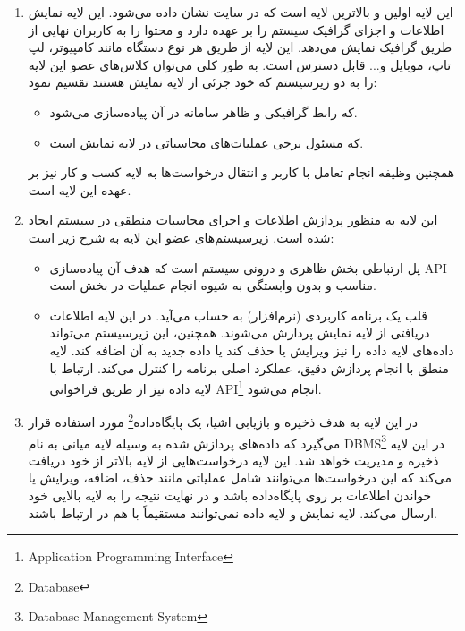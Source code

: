 \documentclass[12pt]{article}
\begin{document}
	\begin{enumerate}
		\item {}
		این لایه اولین و بالاترین لایه است که در سایت نشان داده می‌شود. این لایه نمایش اطلاعات و اجزای گرافیک سیستم را بر عهده دارد و محتوا را به کاربران نهایی از طریق گرافیک نمایش می‌دهد. این لایه از طریق هر نوع دستگاه مانند کامپیوتر، لپ تاپ، موبایل و... قابل دسترس است. به طور کلی می‌توان کلاس‌های عضو این لایه را به دو زیرسیستم که خود جزئی از لایه نمایش هستند تقسیم نمود:

		\begin{itemize}
			\item {}
			که رابط گرافیکی و ظاهر سامانه در آن پیاده‌سازی می‌شود.
			\item {}
			که مسئول برخی عملیات‌های محاسباتی در لایه نمایش است.
		\end{itemize}
		همچنین وظیفه انجام تعامل با کاربر و انتقال درخواست‌ها به لایه کسب و کار نیز بر عهده این لایه است.

		\item {}
		این لایه به منظور پردازش اطلاعات و اجرای محاسبات منطقی در سیستم ایجاد شده است. زیرسیستم‌های عضو این لایه به شرح زیر است:

		\begin{itemize}
			\item {}
			پل ارتباطی بخش ظاهری و درونی سیستم است که هدف آن پیاده‌سازی API مناسب و بدون وابستگی به شیوه انجام عملیات در بخش
			است.

			\item {}
			قلب یک برنامه کاربردی (نرم‌افزار) به حساب می‌آید. در این لایه اطلاعات دریافتی از لایه نمایش پردازش می‌شوند. همچنین، این زیرسیستم می‌تواند داده‌های لایه داده را نیز ویرایش یا حذف کند یا داده جدید به آن اضافه کند. لایه منطق با انجام پردازش دقیق، عملکرد اصلی برنامه را کنترل می‌کند. ارتباط با لایه داده نیز از طریق فراخوانی API\footnote{Application Programming Interface} انجام می‌شود.
		\end{itemize}

		\item {}
		در این لایه به هدف ذخیره و بازیابی اشیا، یک پایگاه‌داده\footnote{Database} مورد استفاده قرار می‌گیرد که داده‌های پردازش شده به وسيله لایه میانی به نام DBMS\footnote{Database Management System} در این لایه ذخیره و مدیریت خواهد شد. این لایه درخواست‌هایی از لایه بالاتر از خود دریافت می‌کند که این درخواست‌ها می‌توانند شامل عملیاتی مانند حذف، اضافه، ویرایش یا خواندن اطلاعات بر روی پایگاه‌داده باشد و در نهایت نتیجه را به لایه بالایی خود ارسال می‌کند. لایه نمایش و لایه داده نمی‌توانند مستقیماً با هم در ارتباط باشند.


\end{enumerate}
\end{document}
